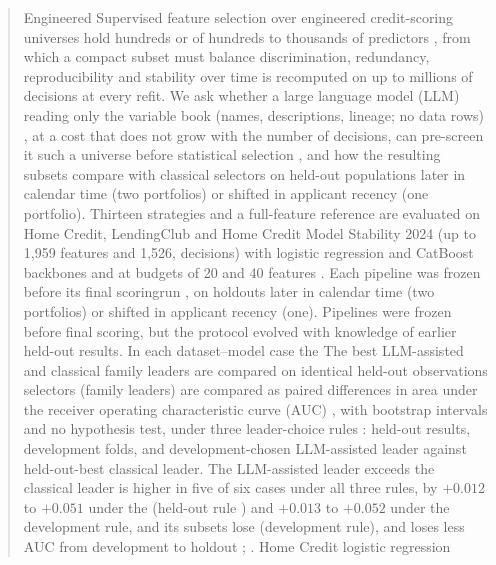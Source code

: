 \documentclass[final,5p,twocolumn]{elsarticle}
\providecommand{\DIFaddtex}[1]{{\protect\color{blue} \sf #1}} %
\providecommand{\DIFdeltex}[1]{{\protect\color{red} \scriptsize #1}} %
\providecommand{\DIFaddbegin}{} %
\providecommand{\DIFaddend}{} %
\providecommand{\DIFdelbegin}{} %
\providecommand{\DIFdelend}{} %
\providecommand{\DIFadd}[1]{\texorpdfstring{\DIFaddtex{#1}}{#1}} %
\providecommand{\DIFdel}[1]{\texorpdfstring{\DIFdeltex{#1}}{}} %
\begin{document}
\begin{frontmatter}
\begin{abstract}
\DIFdelbegin \DIFdel{Engineered }\DIFdelend \DIFaddbegin \DIFadd{Supervised feature selection over engineered }\DIFaddend credit-scoring universes \DIFdelbegin \DIFdel{hold hundreds or }\DIFdelend \DIFaddbegin \DIFadd{of hundreds to }\DIFaddend thousands of predictors \DIFdelbegin \DIFdel{, from which a compact subset must balance discrimination, redundancy, reproducibility and stability over time}\DIFdelend \DIFaddbegin \DIFadd{is recomputed on up to millions of decisions at every refit}\DIFaddend . We ask whether a large language model (LLM) reading \DIFaddbegin \DIFadd{only }\DIFaddend the variable book (names, descriptions, lineage; no data rows)\DIFaddbegin \DIFadd{, at a cost that does not grow with the number of decisions, }\DIFaddend can pre-screen \DIFdelbegin \DIFdel{it }\DIFdelend \DIFaddbegin \DIFadd{such a universe }\DIFaddend before statistical selection\DIFdelbegin \DIFdel{, and how the resulting subsets compare with classical selectors on held-out populations later in calendar time (two portfolios) or shifted in applicant recency (one portfolio)}\DIFdelend . Thirteen strategies \DIFdelbegin \DIFdel{and a full-feature reference }\DIFdelend are evaluated on Home Credit, LendingClub and Home Credit Model Stability 2024 \DIFaddbegin \DIFadd{(up to 1,959 features and 1,526}\DIFaddend ,\DIFaddbegin \DIFadd{659 decisions) }\DIFaddend with logistic regression and CatBoost \DIFdelbegin \DIFdel{backbones and }\DIFdelend \DIFaddbegin \DIFadd{at }\DIFaddend budgets of 20 and 40 features\DIFdelbegin \DIFdel{. Each pipeline was frozen before its final scoringrun}\DIFdelend \DIFaddbegin \DIFadd{, on holdouts later in calendar time (two portfolios) or shifted in applicant recency (one). Pipelines were frozen before final scoring}\DIFaddend , but the protocol evolved with knowledge of earlier held-out results. \DIFdelbegin \DIFdel{In each dataset--model case the }\DIFdelend \DIFaddbegin \DIFadd{The best }\DIFaddend LLM-assisted and classical \DIFdelbegin \DIFdel{family leaders are compared on identical held-out observations }\DIFdelend \DIFaddbegin \DIFadd{selectors (family leaders) are compared }\DIFaddend as paired differences in area under the receiver operating characteristic curve (AUC)\DIFaddbegin \DIFadd{, }\DIFaddend with bootstrap intervals and no hypothesis test, under three leader-choice rules\DIFdelbegin \DIFdel{: held-out results, development folds, and development-chosen LLM-assisted leader against held-out-best classical leader}\DIFdelend . The LLM-assisted leader \DIFdelbegin \DIFdel{exceeds the classical leader }\DIFdelend \DIFaddbegin \DIFadd{is higher }\DIFaddend in five of six cases under all three rules, by $+0.012$ to $+0.051$ \DIFdelbegin \DIFdel{under the }\DIFdelend \DIFaddbegin \DIFadd{(}\DIFaddend held-out rule\DIFaddbegin \DIFadd{) }\DIFaddend and $+0.013$ to $+0.052$ \DIFdelbegin \DIFdel{under the development rule, and its subsets lose }\DIFdelend \DIFaddbegin \DIFadd{(development rule), and loses }\DIFaddend less AUC from development to holdout\DIFdelbegin \DIFdel{; }\DIFdelend \DIFaddbegin \DIFadd{. }\DIFaddend Home Credit logistic regression 
\end{abstract}
\end{frontmatter}
\end{document}
